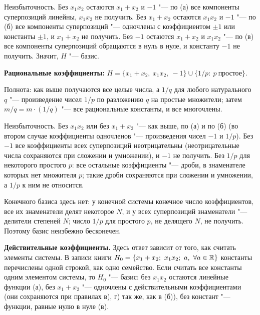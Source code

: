 \begin{solution}[7 (\S\,4)]
Неизбыточность. Без $x_1x_2$ остаются $x_1+x_2$ и $-1$ "--- по (а) все
компоненты суперпозиций линейны, $x_1x_2$ не получить. Без $x_1+x_2$ остаются
$x_1x_2$ и $-1$ "--- по (б) все компоненты суперпозиций "--- одночлены
с коэффициентом $\pm1$ или константы $\pm1$, и $x_1+x_2$ не получить. Без $-1$
остаются $x_1+x_2$ и $x_1x_2$ "--- по (в) все компоненты суперпозиций
обращаются в нуль в нуле, и константу $-1$ не получить. Значит, $H$ "--- базис.

\textbf{Рациональные коэффициенты:}
$H=\{x_1+x_2,\ x_1x_2,\ -1\}\cup\{1/p:\ p\ \text{простое}\}$.

Полнота: как выше получаются все целые числа, а $1/q$ для любого
натурального $q$ "--- произведение чисел $1/p$ по разложению $q$ на простые
множители; затем $m/q=m\cdot(1/q)$ "--- все рациональные константы, и все
многочлены.

Неизбыточность. Без $x_1x_2$ или без $x_1+x_2$ "--- как выше, по (а) и по
(б) (во втором случае коэффициенты одночленов "--- произведения чисел $-1$ и
$1/p$). Без $-1$ все коэффициенты всех суперпозиций неотрицательны
(неотрицательные числа сохраняются при сложении и умножении), и $-1$ не
получить. Без $1/p$ для некоторого простого $p$: все остальные коэффициенты
"--- дроби, в знаменателе которых нет множителя $p$; такие дроби сохраняются
при сложении и умножении, а $1/p$ к ним не относится.

Конечного базиса здесь нет: у конечной системы конечное число
коэффициентов, все их знаменатели делят некоторое $N$, и у всех суперпозиций
знаменатели "--- делители степеней $N$; число $1/p$ для простого $p$, не
делящего $N$, не получить. Поэтому базис неизбежно бесконечен.

\textbf{Действительные коэффициенты.} Здесь ответ зависит от того, как
считать элементы системы. В записи книги $H_0=\{x_1+x_2;\ x_1x_2;\ a,\
\forall a\in\mathbb R\}$ константы перечислены одной строкой, как одно семейство.
Если считать все константы одним элементом системы, то $H_0$ "--- базис: без
$x_1x_2$ остаются линейные функции (а), без $x_1+x_2$ "--- одночлены с
действительными коэффициентами (они сохраняются при правилах в), г) так же,
как в (б)), без констант "--- функции, равные нулю в нуле (в).


\end{solution}
